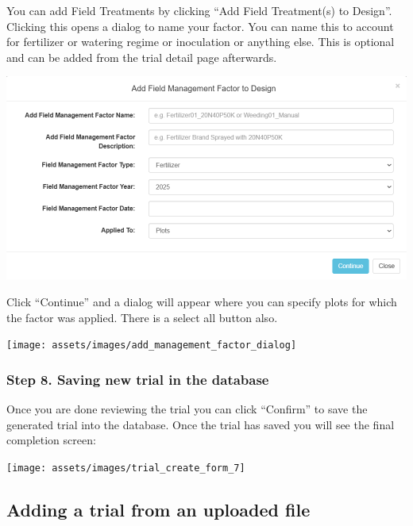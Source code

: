 \documentclass[
  12pt,
]{book}
\begin{document}
You can add Field Treatments by clicking ``Add Field Treatment(s) to Design''. Clicking this opens a dialog to name your factor. You can name this to account for fertilizer or watering regime or inoculation or anything else. This is optional and can be added from the trial detail page afterwards.

\begin{center}\includegraphics[width=0.95\linewidth]{assets/images/add_management_factor_name_dialog} \end{center}

Click ``Continue'' and a dialog will appear where you can specify plots for which the factor was applied. There is a select all button also.

\begin{center}\texttt{[image: assets/images/add\_management\_factor\_dialog]} \end{center}

\hypertarget{step-8.-saving-new-trial-in-the-database}{%
\subsubsection*{Step 8. Saving new trial in the database}\label{step-8.-saving-new-trial-in-the-database}}


Once you are done reviewing the trial you can click ``Confirm'' to save the generated trial into the database. Once the trial has saved you will see the final completion screen:

\begin{center}\texttt{[image: assets/images/trial\_create\_form\_7]} \end{center}

\hypertarget{adding-a-trial-from-an-uploaded-file}{%
\subsection{Adding a trial from an uploaded file}\label{adding-a-trial-from-an-uploaded-file}}
\end{document}
